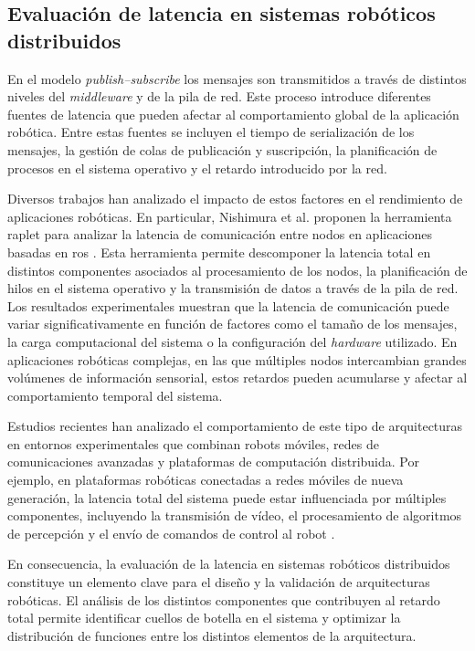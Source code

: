 \subsection{Evaluación de latencia en sistemas robóticos distribuidos}
\label{sec:evaluacion_de_latencia_en_sistemas_roboticos_distribuidos}

En el modelo \textit{publish--subscribe} los mensajes son transmitidos a través de distintos niveles del \textit{middleware} y de la pila de red. Este proceso introduce diferentes fuentes de latencia que pueden afectar al comportamiento global de la aplicación robótica. Entre estas fuentes se incluyen el tiempo de serialización de los mensajes, la gestión de colas de publicación y suscripción, la planificación de procesos en el sistema operativo y el retardo introducido por la red.

Diversos trabajos han analizado el impacto de estos factores en el rendimiento de aplicaciones robóticas. En particular, Nishimura et al. proponen la herramienta \gls{raplet} para analizar la latencia de comunicación entre nodos en aplicaciones basadas en \gls{ros} \cite{nishimura2021raplet}. Esta herramienta permite descomponer la latencia total en distintos componentes asociados al procesamiento de los nodos, la planificación de hilos en el sistema operativo y la transmisión de datos a través de la pila de red. Los resultados experimentales muestran que la latencia de comunicación puede variar significativamente en función de factores como el tamaño de los mensajes, la carga computacional del sistema o la configuración del \textit{hardware} utilizado. En aplicaciones robóticas complejas, en las que múltiples nodos intercambian grandes volúmenes de información sensorial, estos retardos pueden acumularse y afectar al comportamiento temporal del sistema.

Estudios recientes han analizado el comportamiento de este tipo de arquitecturas en entornos experimentales que combinan robots móviles, redes de comunicaciones avanzadas y plataformas de computación distribuida. Por ejemplo, en plataformas robóticas conectadas a redes móviles de nueva generación, la latencia total del sistema puede estar influenciada por múltiples componentes, incluyendo la transmisión de vídeo, el procesamiento de algoritmos de percepción y el envío de comandos de control al robot \cite{Lozano2025DigitalTwin6G}.

En consecuencia, la evaluación de la latencia en sistemas robóticos distribuidos constituye un elemento clave para el diseño y la validación de arquitecturas robóticas. El análisis de los distintos componentes que contribuyen al retardo total permite identificar cuellos de botella en el sistema y optimizar la distribución de funciones entre los distintos elementos de la arquitectura.